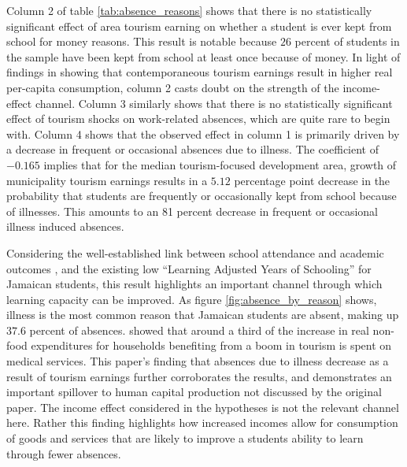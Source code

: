\documentclass[12pt]{article}
\begin{document}
	Column 2 of table \ref{tab:absence_reasons} shows that there is no statistically significant effect of area tourism earning on whether a student is ever kept from school for money reasons. This result is notable because $26$ percent of students in the sample have been kept from school at least once because of money. In light of findings in \textcite{mcketty_sun_2026} showing that contemporaneous tourism earnings result in higher real per-capita consumption, column 2 casts doubt on the strength of the income-effect channel. Column 3 similarly shows that there is no statistically significant effect of tourism shocks on work-related absences, which are quite rare to begin with. Column 4 shows that the observed effect in column 1 is primarily driven by a decrease in frequent or occasional absences due to illness. The coefficient of $-0.165$ implies that for the median tourism-focused development area, growth of municipality tourism earnings results in a $5.12$ percentage point decrease in the probability that students are frequently or occasionally kept from school because of illnesses. This amounts to an 81 percent decrease in frequent or occasional illness induced absences. 
	
	Considering the well-established link between school attendance and academic outcomes \parencite{ aucejo_assessing_2016}, and the existing low ``Learning Adjusted Years of Schooling'' for Jamaican students, this result highlights an important channel through which learning capacity can be improved. As figure \ref{fig:absence_by_reason} shows, illness is the most common reason that Jamaican students are absent, making up $37.6$ percent of absences. \textcite{ mcketty_sun_2026} showed that around a third of the increase in real non-food expenditures for households benefiting from a boom in tourism is spent on medical services. This paper's finding that absences due to illness decrease as a result of tourism earnings further corroborates the \textcite{ mcketty_sun_2026} results, and demonstrates an important spillover to human capital production not discussed by the original paper. The income effect considered in the hypotheses is not the relevant channel here. Rather this finding highlights how increased incomes allow for consumption of goods and services that are likely to improve a students ability to learn through fewer absences. 
	
\end{document}
